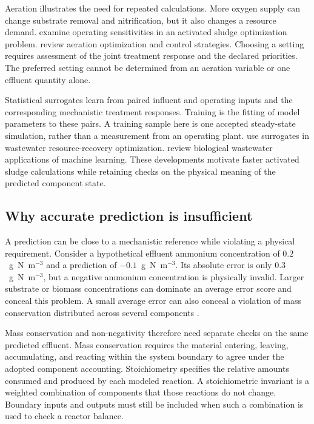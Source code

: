 Aeration illustrates the need for repeated calculations. More oxygen supply can change substrate removal and nitrification, but it also changes a resource demand. \citet{Araujo2013} examine operating sensitivities in an activated sludge optimization problem. \citet{Gu2023} review aeration optimization and control strategies. Choosing a setting requires assessment of the joint treatment response and the declared priorities. The preferred setting cannot be determined from an aeration variable or one effluent quantity alone.

Statistical surrogates learn from paired influent and operating inputs and the corresponding mechanistic treatment responses. Training is the fitting of model parameters to these pairs. A training sample here is one accepted steady-state simulation, rather than a measurement from an operating plant. \citet{Durkin2024} use surrogates in wastewater resource-recovery optimization. \citet{Sundui2021} review biological wastewater applications of machine learning. These developments motivate faster activated sludge calculations while retaining checks on the physical meaning of the predicted component state.

\subsection{Why accurate prediction is insufficient}

A prediction can be close to a mechanistic reference while violating a physical requirement. Consider a hypothetical effluent ammonium concentration of $0.2$~g~N~m$^{-3}$ and a prediction of $-0.1$~g~N~m$^{-3}$. Its absolute error is only $0.3$~g~N~m$^{-3}$, but a negative ammonium concentration is physically invalid. Larger substrate or biomass concentrations can dominate an average error score and conceal this problem. A small average error can also conceal a violation of mass conservation distributed across several components \citep{Hansen2024,KircherVotsmeier2025}.

Mass conservation and non-negativity therefore need separate checks on the same predicted effluent. Mass conservation requires the material entering, leaving, accumulating, and reacting within the system boundary to agree under the adopted component accounting. Stoichiometry specifies the relative amounts consumed and produced by each modeled reaction. A stoichiometric invariant is a weighted combination of components that those reactions do not change. Boundary inputs and outputs must still be included when such a combination is used to check a reactor balance.

